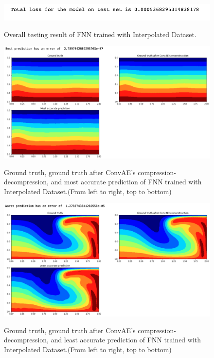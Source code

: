 \begin{figure}[H]
    \caption{Overall testing result of FNN trained with Interpolated Dataset.}
    \includegraphics[scale=0.8]{figures/mantle_convection_images/larger_dataset_interpolated/FNN_OverallTesting.png}
    \label{figure:FNN_interpolated_testing}
\end{figure}

\begin{figure}[H]
    \caption{Ground truth, ground truth after ConvAE's compression-decompression, and most accurate prediction of FNN trained with Interpolated Dataset.(From left to right, top to bottom)}
    \includegraphics[scale=0.5]{figures/mantle_convection_images/larger_dataset_interpolated/FNN_Best.png}
    \label{figure:FNN_interpolated_best}
\end{figure}

\begin{figure}[H]
    \caption{Ground truth, ground truth after ConvAE's compression-decompression, and least accurate prediction of FNN trained with Interpolated Dataset.(From left to right, top to bottom)}
    \includegraphics[scale=0.5]{figures/mantle_convection_images/larger_dataset_interpolated/FNN_Worst.png}
    \label{figure:FNN_interpolated_worst}
\end{figure}

